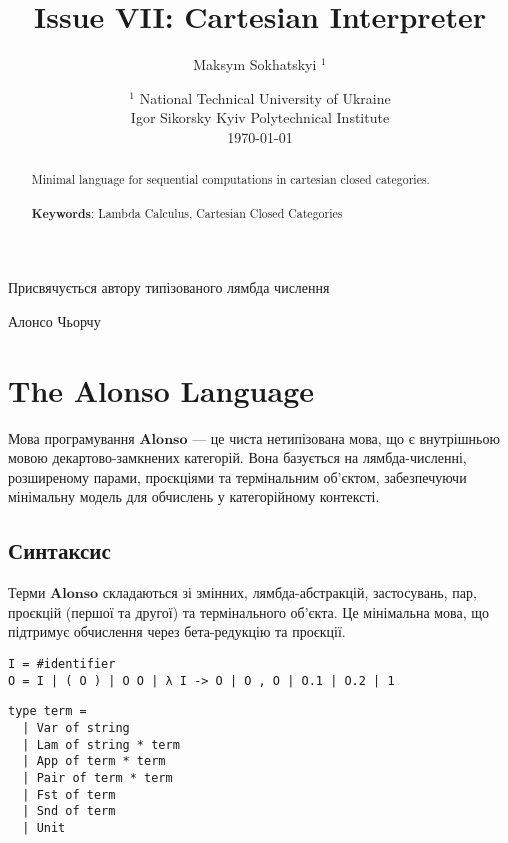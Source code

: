 \documentclass{article}
\theoremstyle{definition}
\begin{document}
\title{Issue VII: Cartesian Interpreter}
\author{Maksym Sokhatskyi $^1$}
\date{ $^1$ National Technical University of Ukraine \\
       \small Igor Sikorsky Kyiv Polytechnical Institute \\
       \today }

\maketitle

\begin{abstract}

Minimal language for sequential computations in cartesian closed categories.
\\
\\
{\bf Keywords}: Lambda Calculus, Cartesian Closed Categories
\end{abstract}

\ifincludeTOC
  \tableofcontents
\fi

\newpage

\epigraph{Присвячується автору типізованого лямбда числення}{Алонсо Чьорчу}

\section{The Alonso Language}

Мова програмування $\mathbf{Alonso}$ — це чиста нетипізована мова, що є внутрішньою мовою декартово-замкнених категорій. Вона базується на лямбда-численні, розширеному парами, проєкціями та термінальним об’єктом, забезпечуючи мінімальну модель для обчислень у категорійному контексті.

\subsection{Синтаксис}

Терми $\mathbf{Alonso}$ складаються зі змінних, лямбда-абстракцій, застосувань, пар, проєкцій (першої та другої) та термінального об’єкта. Це мінімальна мова, що підтримує обчислення через бета-редукцію та проєкції.

\begin{lstlisting}[mathescape=true]
I = #identifier
O = I | ( O ) | O O | λ I -> O | O , O | O.1 | O.2 | 1
\end{lstlisting}

\begin{lstlisting}[mathescape=true]
type term =
  | Var of string
  | Lam of string * term
  | App of term * term
  | Pair of term * term
  | Fst of term
  | Snd of term
  | Unit
\end{lstlisting}
\end{document}
